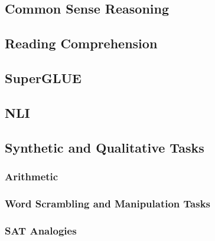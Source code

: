 \documentclass{article}
\begin{document}
    \subsection{Common Sense Reasoning}
    \label{section:Common_Sense_Reasoning}
    
    
    \subsection{Reading Comprehension}
    \label{section:Reading_Comprehension}
    

    
    
    \subsection{SuperGLUE}
    \label{section:SuperGLUE}
    

    
    \subsection{NLI}
    \label{section:ANLI}
    

    \subsection{Synthetic and Qualitative Tasks}
    \label{section:Synthetic_and_Qualitative_Tasks}
    
    
        \subsubsection{Arithmetic}
        \label{section:Arithmetic}
        
        
        \subsubsection{Word Scrambling and Manipulation Tasks}
        \label{section:Word_Scrambling_and_Manipulation_Tasks}
        
        
        \subsubsection{SAT Analogies}
        \label{section:SAT_Analogies}
        
        
\end{document}

